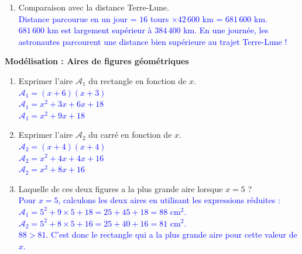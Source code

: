 \documentclass[a4paper]{book}
\begin{document}
{\begin{exercice}
\begin{enumerate}
            \item Comparaison avec la distance Terre-Lune. \\
            \textcolor{blue}{Distance parcourue en un jour = $16$ tours $\times 42\,600$ km = $681\,600$ km. \\ $681\,600$ km est largement supérieur à $384\,400$ km. En une journée, les astronautes parcourent une distance bien supérieure au trajet Terre-Lune !}
        \end{enumerate}
    \end{exercice}

    \vspace{0.5cm}

    \begin{exercice}
        \textbf{Modélisation : Aires de figures géométriques} 
    
        \begin{enumerate}
            \item Exprimer l'aire $\mathcal{A}_1$ du rectangle en fonction de $x$. \\
            \textcolor{blue}{$\mathcal{A}_1 = (x + 6)(x + 3)$ \\ $\mathcal{A}_1 = x^2 + 3x + 6x + 18$ \\ $\mathcal{A}_1 = x^2 + 9x + 18$}
            
            \item Exprimer l'aire $\mathcal{A}_2$ du carré en fonction de $x$. \\
            \textcolor{blue}{$\mathcal{A}_2 = (x + 4)(x + 4)$ \\ $\mathcal{A}_2 = x^2 + 4x + 4x + 16$ \\ $\mathcal{A}_2 = x^2 + 8x + 16$}
            
            \item Laquelle de ces deux figures a la plus grande aire lorsque $x = 5$ ? \\
            \textcolor{blue}{Pour $x = 5$, calculons les deux aires en utilisant les expressions réduites : \\ $\mathcal{A}_1 = 5^2 + 9 \times 5 + 18 = 25 + 45 + 18 = 88$ cm$^2$. \\ $\mathcal{A}_2 = 5^2 + 8 \times 5 + 16 = 25 + 40 + 16 = 81$ cm$^2$. \\ $88 > 81$. C'est donc le rectangle qui a la plus grande aire pour cette valeur de $x$.}
        \end{enumerate}
    \end{exercice}
    
}
\end{document}
